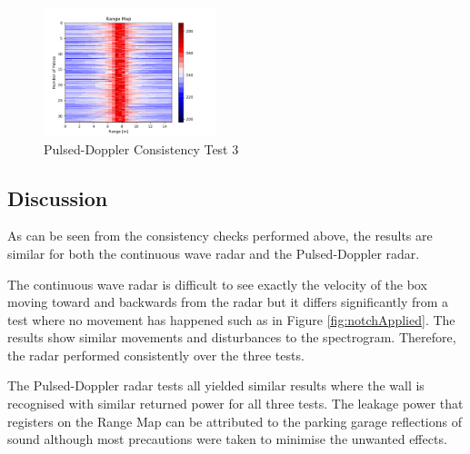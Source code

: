 \begin{figure}[h!]
    \centering
    \includegraphics[width = 0.4464\textwidth]{images/consistPDResults3.pdf}
    \caption{Pulsed-Doppler Consistency Test 3}\label{fig:consistPDResults3}
\end{figure}



\subsection{Discussion}
As can be seen from the consistency checks performed above, the results are similar for both the continuous wave radar and the Pulsed-Doppler radar. 

The continuous wave radar is difficult to see exactly the velocity of the box moving toward and backwards from the radar but it differs significantly from a test where no movement has happened such as in Figure \ref{fig:notchApplied}. The results show similar movements and disturbances to the spectrogram. Therefore, the radar performed consistently over the three tests.

The Pulsed-Doppler radar tests all yielded similar results where the wall is recognised with similar returned power for all three tests. The leakage power that registers on the Range Map can be attributed to the parking garage reflections of sound although most precautions were taken to minimise the unwanted effects.

\newpage